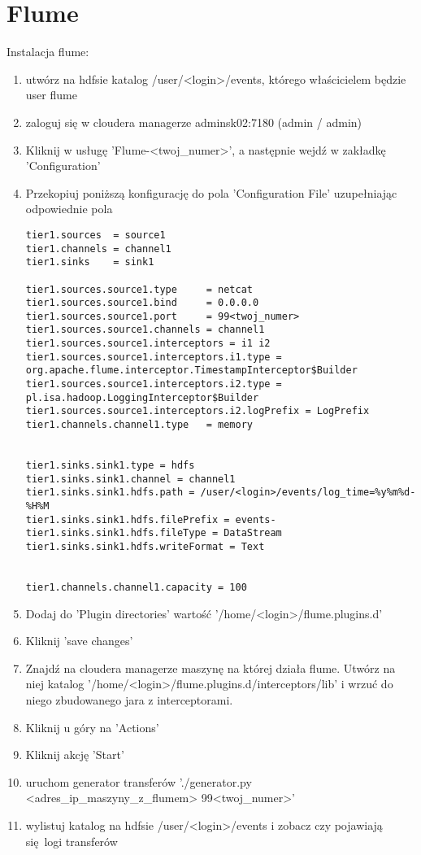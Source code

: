 \documentclass{article}
\begin{document}
\section*{Flume}

Instalacja flume:
\begin{enumerate}
\item utwórz na hdfsie katalog /user/<login>/events, którego właścicielem będzie user flume
\item zaloguj się w cloudera managerze adminsk02:7180 (admin / admin)
\item Kliknij w usługę 'Flume-<twoj\_numer>', a następnie wejdź w zakładkę 'Configuration'
\item Przekopiuj poniższą konfigurację do pola 'Configuration File' uzupełniając odpowiednie pola
\begin{lstlisting}
tier1.sources  = source1
tier1.channels = channel1
tier1.sinks    = sink1

tier1.sources.source1.type     = netcat
tier1.sources.source1.bind     = 0.0.0.0
tier1.sources.source1.port     = 99<twoj_numer>
tier1.sources.source1.channels = channel1
tier1.sources.source1.interceptors = i1 i2
tier1.sources.source1.interceptors.i1.type = org.apache.flume.interceptor.TimestampInterceptor$Builder
tier1.sources.source1.interceptors.i2.type = pl.isa.hadoop.LoggingInterceptor$Builder
tier1.sources.source1.interceptors.i2.logPrefix = LogPrefix
tier1.channels.channel1.type   = memory


tier1.sinks.sink1.type = hdfs
tier1.sinks.sink1.channel = channel1
tier1.sinks.sink1.hdfs.path = /user/<login>/events/log_time=%y%m%d-%H%M
tier1.sinks.sink1.hdfs.filePrefix = events-
tier1.sinks.sink1.hdfs.fileType = DataStream
tier1.sinks.sink1.hdfs.writeFormat = Text


tier1.channels.channel1.capacity = 100
\end{lstlisting}
\item Dodaj do 'Plugin directories' wartość '/home/<login>/flume.plugins.d'
\item Kliknij 'save changes'
\item Znajdź na cloudera managerze maszynę na której działa flume. Utwórz na niej katalog '/home/<login>/flume.plugins.d/interceptors/lib' i wrzuć do niego zbudowanego jara z interceptorami.
\item Kliknij u góry na 'Actions'
\item Kliknij akcję 'Start'
\item uruchom generator transferów './generator.py <adres\_ip\_maszyny\_z\_flumem> 99<twoj\_numer>'
\item wylistuj katalog na hdfsie /user/<login>/events i zobacz czy pojawiają się logi transferów
\end{enumerate}
\end{document}
